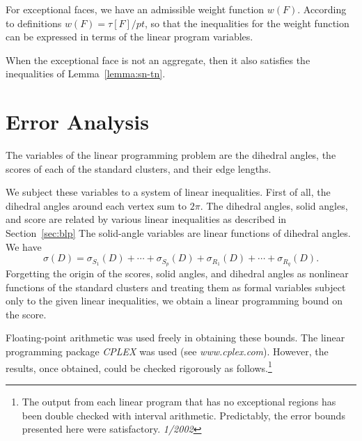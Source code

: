 For exceptional faces, we have an admissible weight function $w(F)$.
According to definitions $w(F) = \tau[F]/pt$, so that the inequalities
for the weight function can be expressed in terms of the linear program
variables.

When the exceptional face is not an aggregate, then it also
satisfies the inequalities of Lemma~\ref{lemma:sn-tn}.


\section{Error Analysis}

The variables of the linear programming problem are the dihedral
angles, the scores of each of the standard clusters, and their
edge lengths.

We subject these variables to a system of linear inequalities.
First of all, the dihedral angles around each vertex sum to
$2\pi$. The dihedral angles, solid angles, and score are related
by various linear inequalities as described in
Section~\ref{sec:blp}
The solid-angle variables are linear functions of dihedral angles.
We have
    $$
    \sigma(D)=
    \sigma_{S_1}(D)+\cdots+
    \sigma_{S_p}(D)+\sigma_{R_1}(D)+\cdots+\sigma_{R_q}(D).
    $$
Forgetting the origin of the scores, solid angles, and dihedral
angles as nonlinear functions of the standard clusters and
treating them as formal variables subject only to the given linear
inequalities, we obtain a linear programming bound on the score.

Floating-point arithmetic was used freely in obtaining these
bounds. The linear programming package {\it CPLEX\/} was used (see
{\it www.cplex.com}). However, the results, once obtained, could
be checked rigorously as follows.\footnote{The output from each
linear program that has no exceptional regions has been double
checked with interval arithmetic. Predictably, the error bounds
presented here were satisfactory.  {\it 1/2002}}

